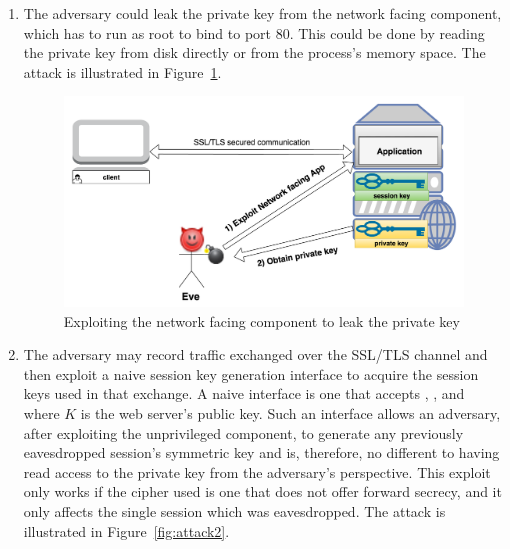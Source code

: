 \documentclass[../main.tex]{subfiles}
\begin{document}
\begin{enumerate}
  \item The adversary could leak the private key from the network facing
    component, which has to run as root to bind to port 80.  This could
    be done by reading the private key from disk directly or from the
    process's memory space. The attack is illustrated in
    Figure~\ref{fig:attack1}.

	\begin{figure}[H]
          \centering
          \includegraphics[scale=0.15]{images/attack1.png}
          \caption{Exploiting the network facing component to leak the
            private key}
          \label{fig:attack1}
	\end{figure}

  \item The adversary may record traffic exchanged over the SSL/TLS
    channel and then exploit a naive session key generation interface to
    acquire the session keys used in that exchange. A naive interface is
    one that accepts \crandom, \srandom, and \premaster~ where $K$ is the
    web server's public key.  Such an interface allows an adversary, after
    exploiting the unprivileged component, to generate any previously
    eavesdropped session's symmetric key and is, therefore, no different
    to having read access to the private key from the adversary's
    perspective. This exploit only works if the cipher used is one that
    does not offer forward secrecy, and it only affects the
    single session which was eavesdropped. The attack is illustrated in
    Figure~\ref{fig:attack2}.


\end{enumerate}
\end{document}
